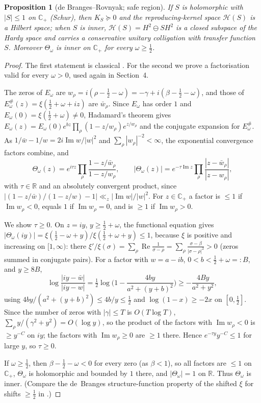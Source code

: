\documentclass[11pt]{amsart}
\newtheorem{proposition}[theorem]{Proposition}
\theoremstyle{definition}
\theoremstyle{remark}
\renewcommand{\Re}{\operatorname{Re}}
\renewcommand{\Im}{\operatorname{Im}}
\newcommand{\half}{\tfrac{1}{2}}
\newcommand{\om}{\omega}
\newcommand{\gam}{\gamma}
\newcommand{\R}{\mathbb{R}}
\newcommand{\C}{\mathbb{C}}
\newcommand{\Th}{\Theta}
\begin{document}
\begin{proposition}[de Branges--Rovnyak; safe region]\label{prop:model}
If $S$ is holomorphic with $|S|\le1$ on $\C_+$ (\emph{Schur}), then $K_S\succeq0$ and the
reproducing-kernel space $\mathcal H(S)$ is a Hilbert space; when $S$ is inner,
$\mathcal H(S)=H^2\ominus SH^2$ is a closed subspace of the Hardy space and carries a conservative
unitary colligation with transfer function $S$. Moreover $\Th_\om$ is inner on $\C_+$ for every
$\om\ge\tfrac12$.
\end{proposition}
\begin{proof}
The first statement is classical \cite{SNF,deB}. For the second we prove a factorisation valid for
every $\om>0$, used again in Section~4.

The zeros of $E_\om$ are $w_\rho=i(\rho-\half-\om)=-\gam+i(\beta-\half-\om)$, and those of
$E_\om^\#(z)=\xi(\half+\om+iz)$ are $\bar w_\rho$. Since $E_\om$ has order $1$ and
$E_\om(0)=\xi(\half+\om)\neq0$, Hadamard's theorem gives
$E_\om(z)=E_\om(0)e^{bz}\prod_\rho(1-z/w_\rho)e^{z/w_\rho}$ and the conjugate expansion for
$E_\om^\#$. As $1/\bar w-1/w=2i\Im w/|w|^2$ and $\sum_\rho|w_\rho|^{-2}<\infty$, the exponential
convergence factors combine, and
\begin{equation}\label{eq:factor}
   \Th_\om(z)=e^{i\tau z}\prod_\rho\frac{1-z/\bar w_\rho}{1-z/w_\rho},\qquad
   |\Th_\om(z)|=e^{-\tau\Im z}\prod_\rho\frac{|z-\bar w_\rho|}{|z-w_\rho|},
\end{equation}
with $\tau\in\R$ and an absolutely convergent product, since
$|(1-z/\bar w)/(1-z/w)-1|\ll_z|\Im w|/|w|^2$. For $z\in\C_+$ a factor is $\le1$ if
$\Im w_\rho<0$, equals $1$ if $\Im w_\rho=0$, and is $\ge1$ if $\Im w_\rho>0$.

We show $\tau\ge0$. On $z=iy$, $y\ge\half+\om$, the functional equation gives
$|\Th_\om(iy)|=\xi(\half-\om+y)/\xi(\half+\om+y)\le1$, because $\xi$ is positive and increasing on
$[1,\infty)$: there $\xi'/\xi(\sigma)=\sum_\rho\Re\frac1{\sigma-\rho}
=\sum_\rho\frac{\sigma-\beta}{|\sigma-\rho|^2}>0$ (zeros summed in conjugate pairs). For a factor
with $w=a-ib$, $0<b<\half+\om=:B$, and $y\ge8B$,
\[
  \log\frac{|iy-\bar w|}{|iy-w|}=\tfrac12\log\Big(1-\frac{4by}{a^2+(y+b)^2}\Big)
  \ge-\frac{4By}{a^2+y^2},
\]
using $4by/(a^2+(y+b)^2)\le4b/y\le\half$ and $\log(1-x)\ge-2x$ on $[0,\half]$. Since the number of
zeros with $|\gam|\le T$ is $O(T\log T)$, $\sum_\rho y/(\gam^2+y^2)=O(\log y)$, so the product of
the factors with $\Im w_\rho<0$ is $\ge y^{-C}$ on $iy$; the factors with $\Im w_\rho\ge0$ are
$\ge1$ there. Hence $e^{-\tau y}y^{-C}\le1$ for large $y$, so $\tau\ge0$.

If $\om\ge\half$, then $\beta-\half-\om<0$ for every zero (as $\beta<1$), so all factors are
$\le1$ on $\C_+$, $\Th_\om$ is holomorphic and bounded by $1$ there, and $|\Th_\om|=1$ on $\R$.
Thus $\Th_\om$ is inner. (Compare the de~Branges structure-function property of the shifted
$\xi$ for shifts $\ge\half$ in \cite{Lagarias}.)
\end{proof}
\end{document}
